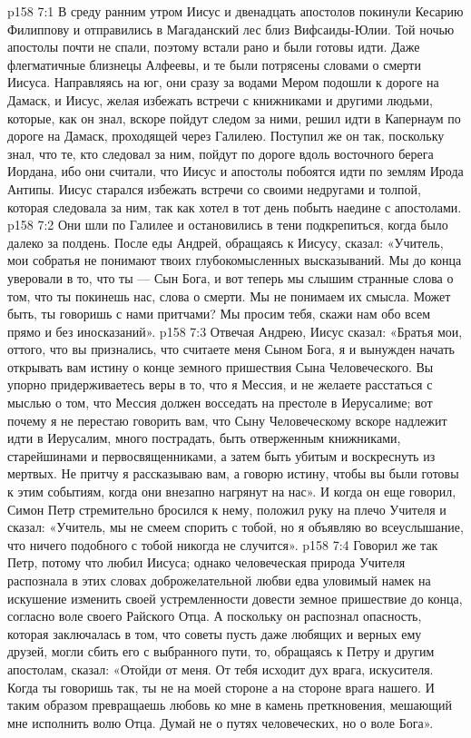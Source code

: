 \vs p158 7:1 В среду ранним утром Иисус и двенадцать апостолов покинули Кесарию Филиппову и отправились в Магаданский лес близ Вифсаиды\hyp{}Юлии. Той ночью апостолы почти не спали, поэтому встали рано и были готовы идти. Даже флегматичные близнецы Алфеевы, и те были потрясены словами о смерти Иисуса. Направляясь на юг, они сразу за водами Мером подошли к дороге на Дамаск, и Иисус, желая избежать встречи с книжниками и другими людьми, которые, как он знал, вскоре пойдут следом за ними, решил идти в Капернаум по дороге на Дамаск, проходящей через Галилею. Поступил же он так, поскольку знал, что те, кто следовал за ним, пойдут по дороге вдоль восточного берега Иордана, ибо они считали, что Иисус и апостолы побоятся идти по землям Ирода Антипы. Иисус старался избежать встречи со своими недругами и толпой, которая следовала за ним, так как хотел в тот день побыть наедине с апостолами.
\vs p158 7:2 Они шли по Галилее и остановились в тени подкрепиться, когда было далеко за полдень. После еды Андрей, обращаясь к Иисусу, сказал: «Учитель, мои собратья не понимают твоих глубокомысленных высказываний. Мы до конца уверовали в то, что ты --- Сын Бога, и вот теперь мы слышим странные слова о том, что ты покинешь нас, слова о смерти. Мы не понимаем их смысла. Может быть, ты говоришь с нами притчами? Мы просим тебя, скажи нам обо всем прямо и без иносказаний».
\vs p158 7:3 Отвечая Андрею, Иисус сказал: «Братья мои, оттого, что вы признались, что считаете меня Сыном Бога, я и вынужден начать открывать вам истину о конце земного пришествия Сына Человеческого. Вы упорно придерживаетесь веры в то, что я Мессия, и не желаете расстаться с мыслью о том, что Мессия должен восседать на престоле в Иерусалиме; вот почему я не перестаю говорить вам, что Сыну Человеческому вскоре надлежит идти в Иерусалим, много пострадать, быть отверженным книжниками, старейшинами и первосвященниками, а затем быть убитым и воскреснуть из мертвых. Не притчу я рассказываю вам, а говорю истину, чтобы вы были готовы к этим событиям, когда они внезапно нагрянут на нас». И когда он еще говорил, Симон Петр стремительно бросился к нему, положил руку на плечо Учителя и сказал: «Учитель, мы не смеем спорить с тобой, но я объявляю во всеуслышание, что ничего подобного с тобой никогда не случится».
\vs p158 7:4 Говорил же так Петр, потому что любил Иисуса; однако человеческая природа Учителя распознала в этих словах доброжелательной любви едва уловимый намек на искушение изменить своей устремленности довести земное пришествие до конца, согласно воле своего Райского Отца. А поскольку он распознал опасность, которая заключалась в том, что советы пусть даже любящих и верных ему друзей, могли сбить его с выбранного пути, то, обращаясь к Петру и другим апостолам, сказал: «Отойди от меня. От тебя исходит дух врага, искусителя. Когда ты говоришь так, ты не на моей стороне а на стороне врага нашего. И таким образом превращаешь любовь ко мне в камень преткновения, мешающий мне исполнить волю Отца. Думай не о путях человеческих, но о воле Бога».

